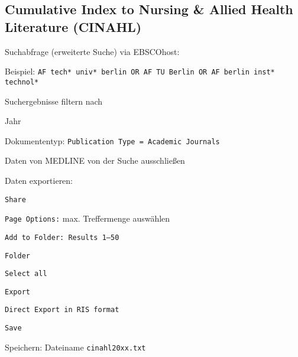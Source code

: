 \subsection*{Cumulative Index to Nursing \& Allied Health Literature (CINAHL)}
\begin{compactitem}
\item Suchabfrage (erweiterte Suche) via EBSCOhost: 
	\begin{compactitem}
	\item Beispiel: \texttt{AF tech* univ* berlin OR AF TU Berlin OR AF berlin inst* \newline technol*}
	\end{compactitem}
\item Suchergebnisse filtern nach
	\begin{compactitem}
    \item Jahr
    \item Dokumententyp: \texttt{Publication Type = Academic Journals}
    \end{compactitem}
\item Daten von MEDLINE von der Suche ausschließen
\item Daten exportieren: 
	\begin{compactitem}
	\item \texttt{Share}
    \item \texttt{Page Options:} max. Treffermenge auswählen
    \item \texttt{Add to Folder: Results 1--50}
    \item \texttt{Folder}
    \item \texttt{Select all}
    \item \texttt{Export}
    \item \texttt{Direct Export in RIS format}
    \item \texttt{Save}
	\end{compactitem}
\item Speichern: Dateiname \texttt{cinahl20xx.txt}
\end{compactitem}

